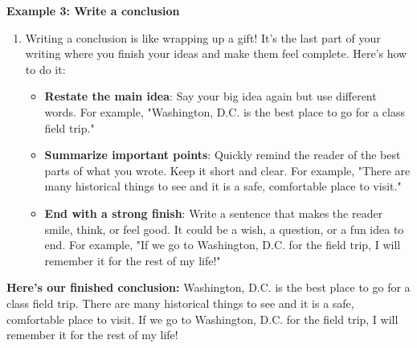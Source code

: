 \documentclass[12pt]{article}
\begin{document}
\begin{tcolorbox}[colframe=black!60, colback=white, 
coltitle=black, colbacktitle=black!15, fonttitle=\bfseries\Large, 
title=Examples, halign title=center, left=10pt, right=10pt, top=10pt, bottom=15pt]

\textbf{Example 3: Write a conclusion}
\begin{enumerate}
    
    \item Writing a conclusion is like wrapping up a gift! It’s the last part of your writing where you finish your ideas and make them feel complete. Here’s how to do it:
    \begin{itemize}
        \item \textbf{Restate the main idea}: Say your big idea again but use different words. For example, "Washington, D.C. is the best place to go for a class field trip."
    \item \textbf{Summarize important points}: Quickly remind the reader of the best parts of what you wrote. Keep it short and clear. For example, "There are many historical things to see and it is a safe, comfortable place to visit."
    \item \textbf{End with a strong finish}: Write a sentence that makes the reader smile, think, or feel good. It could be a wish, a question, or a fun idea to end. For example, "If we go to Washington, D.C. for the field trip, I will remember it for the rest of my life!"

        \end{itemize}
 
\end{enumerate}
 
\textbf{Here's our finished conclusion: }Washington, D.C. is the best place to go for a class field trip. There are many historical things to see and it is a safe, comfortable place to visit. If we go to Washington, D.C. for the field trip, I will remember it for the rest of my life!




     \end{tcolorbox}
\end{document}
